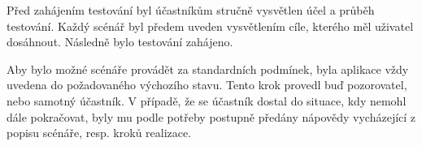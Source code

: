 Před zahájením testování byl účastníkům stručně vysvětlen účel a průběh testování. 
Každý scénář byl předem uveden vysvětlením cíle, kterého měl uživatel dosáhnout. 
Následně bylo testování zahájeno.

Aby bylo možné scénáře provádět za standardních podmínek, byla aplikace vždy uvedena do požadovaného výchozího stavu. 
Tento krok provedl buď pozorovatel, nebo samotný účastník. 
V případě, že se účastník dostal do situace, kdy nemohl dále pokračovat, byly mu podle potřeby postupně předány nápovědy vycházející z popisu scénáře, resp. kroků realizace.









